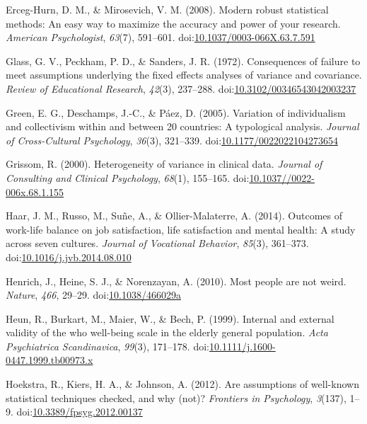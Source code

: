 \documentclass[man,floatsintext]{apa6}
\begin{document}
\hypertarget{ref-Erceg-Hurn_Mirosevich_2008}{}
Erceg-Hurn, D. M., \& Mirosevich, V. M. (2008). Modern robust
statistical methods: An easy way to maximize the accuracy and power of
your research. \emph{American Psychologist}, \emph{63}(7), 591--601.
doi:\href{https://doi.org/10.1037/0003-066X.63.7.591}{10.1037/0003-066X.63.7.591}

\hypertarget{ref-Glass_et_al_1972}{}
Glass, G. V., Peckham, P. D., \& Sanders, J. R. (1972). Consequences of
failure to meet assumptions underlying the fixed effects analyses of
variance and covariance. \emph{Review of Educational Research},
\emph{42}(3), 237--288.
doi:\href{https://doi.org/10.3102/00346543042003237}{10.3102/00346543042003237}

\hypertarget{ref-Green_et_al_2005}{}
Green, E. G., Deschamps, J.-C., \& Páez, D. (2005). Variation of
individualism and collectivism within and between 20 countries: A
typological analysis. \emph{Journal of Cross-Cultural Psychology},
\emph{36}(3), 321--339.
doi:\href{https://doi.org/10.1177/0022022104273654}{10.1177/0022022104273654}

\hypertarget{ref-Grissom_2000}{}
Grissom, R. (2000). Heterogeneity of variance in clinical data.
\emph{Journal of Consulting and Clinical Psychology}, \emph{68}(1),
155--165.
doi:\href{https://doi.org/10.1037//0022-006x.68.1.155}{10.1037//0022-006x.68.1.155}

\hypertarget{ref-Haar_et_al_2014}{}
Haar, J. M., Russo, M., Suñe, A., \& Ollier-Malaterre, A. (2014).
Outcomes of work-life balance on job satisfaction, life satisfaction and
mental health: A study across seven cultures. \emph{Journal of
Vocational Behavior}, \emph{85}(3), 361--373.
doi:\href{https://doi.org/10.1016/j.jvb.2014.08.010}{10.1016/j.jvb.2014.08.010}

\hypertarget{ref-Henrich_et_al_2010}{}
Henrich, J., Heine, S. J., \& Norenzayan, A. (2010). Most people are not
weird. \emph{Nature}, \emph{466}, 29--29.
doi:\href{https://doi.org/10.1038/466029a\%20}{10.1038/466029a }

\hypertarget{ref-Heun_et_al_1999}{}
Heun, R., Burkart, M., Maier, W., \& Bech, P. (1999). Internal and
external validity of the who well-being scale in the elderly general
population. \emph{Acta Psychiatrica Scandinavica}, \emph{99}(3),
171--178.
doi:\href{https://doi.org/10.1111/j.1600-0447.1999.tb00973.x\%20}{10.1111/j.1600-0447.1999.tb00973.x }

\hypertarget{ref-Hoekstra_et_al_2012}{}
Hoekstra, R., Kiers, H. A., \& Johnson, A. (2012). Are assumptions of
well-known statistical techniques checked, and why (not)?
\emph{Frontiers in Psychology}, \emph{3}(137), 1--9.
doi:\href{https://doi.org/10.3389/fpsyg.2012.00137}{10.3389/fpsyg.2012.00137}
\end{document}
